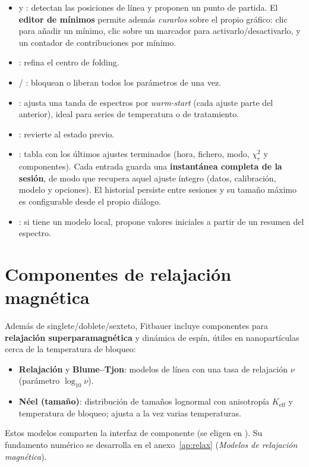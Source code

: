 \begin{itemize}[nosep]
  \item {} y : detectan las posiciones de línea y proponen un punto de
        partida. El \textbf{editor de mínimos} permite además \emph{curarlos}
        sobre el propio gráfico: clic para añadir un mínimo, clic sobre un
        marcador para activarlo/desactivarlo, y un contador de contribuciones por
        mínimo.
  \item {}: refina el centro de folding.
  \item {} / : bloquean o liberan
        todos los parámetros de una vez.
  \item {}: ajusta una tanda de espectros por
        \emph{warm-start} (cada ajuste parte del anterior), ideal para series de
        temperatura o de tratamiento.
  \item {}: revierte al estado previo.
  \item {}: tabla con los últimos ajustes
        terminados (hora, fichero, modo, $\chi^2_r$ y componentes). Cada entrada
        guarda una \textbf{instantánea completa de la sesión}, de modo que
         recupera aquel ajuste íntegro (datos, calibración,
        modelo y opciones). El historial persiste entre sesiones y su tamaño
        máximo es configurable desde el propio diálogo.
  \item {}: si tiene un modelo
        local, propone valores iniciales a partir de un resumen del espectro.
\end{itemize}


\section{Componentes de relajación magnética}

Además de singlete/doblete/sexteto, Fitbauer incluye componentes para
\textbf{relajación superparamagnética} y dinámica de espín, útiles en
nanopartículas cerca de la temperatura de bloqueo:

\begin{itemize}[nosep]
  \item \textbf{Relajación} y \textbf{Blume--Tjon}: modelos de línea con una tasa
        de relajación $\nu$ (parámetro $\log_{10}\nu$).
  \item \textbf{Néel (tamaño)}: distribución de tamaños lognormal con anisotropía
        $K_{\text{eff}}$ y temperatura de bloqueo;  ajusta a la vez varias temperaturas.
\end{itemize}

\begin{nota}
Estos modelos comparten la interfaz de componente (se eligen en ).
Su fundamento numérico se desarrolla en el anexo~\ref{ap:relax} (\emph{Modelos de
relajación magnética}).
\end{nota}
